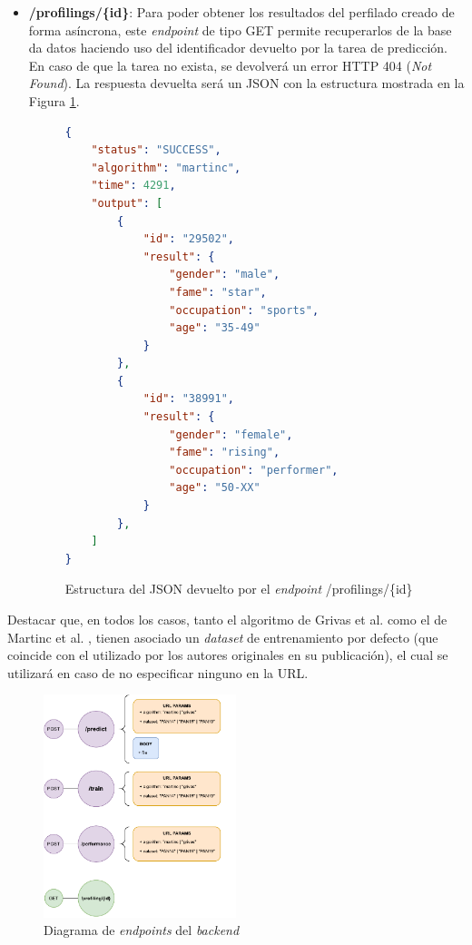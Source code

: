 \begin{itemize}
	\item \textbf{/profilings/\{id\}}: Para poder obtener los resultados del perfilado creado de forma asíncrona, este \textit{endpoint} de tipo GET
	      permite recuperarlos de la base da datos haciendo uso del identificador devuelto por la tarea de predicción. En caso de que la tarea
	      no exista, se devolverá un error HTTP 404 (\textit{Not Found}). La respuesta devuelta será un JSON con la estructura mostrada en la Figura \ref{fig:profiling_json}.

	      \begin{figure}[H]
		      \begin{lstlisting}[language=json]
{
	"status": "SUCCESS",
	"algorithm": "martinc",
	"time": 4291,
	"output": [
		{
			"id": "29502",
			"result": {
				"gender": "male",
				"fame": "star",
				"occupation": "sports",
				"age": "35-49"
			}
		},
		{
			"id": "38991",
			"result": {
				"gender": "female",
				"fame": "rising",
				"occupation": "performer",
				"age": "50-XX"
			}
		},
	]
}\end{lstlisting}
		      \caption{Estructura del JSON devuelto por el \textit{endpoint} /profilings/\{id\}}
		      \label{fig:profiling_json}
	      \end{figure}
\end{itemize}

Destacar que, en todos los casos, tanto el algoritmo de Grivas et al. \cite{grivas2015author} como el de Martinc et al. \cite{martinc2019hot}, tienen asociado un \textit{dataset} de entrenamiento por defecto (que coincide
con el utilizado por los autores originales en su publicación), el cual se utilizará en caso de no especificar ninguno en la URL.

\begin{figure}[H]
	\centering
	\includegraphics[width=0.5\textwidth]{diagramas/endpoints.pdf}
	\caption{Diagrama de \textit{endpoints} del \textit{backend}}
	\label{fig:endpoints}
\end{figure}

